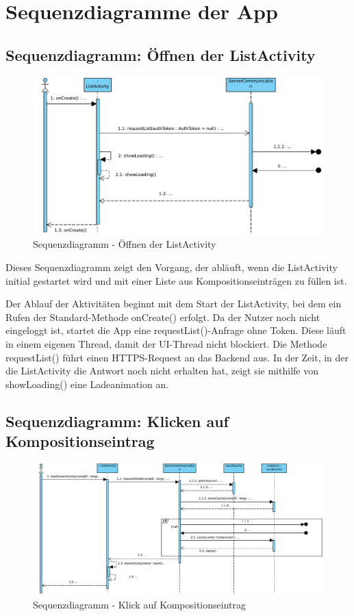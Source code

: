 \section*{Sequenzdiagramme der App}
\subsection*{Sequenzdiagramm: Öffnen der ListActivity}

\begin{figure}[h]
	\centering
	\includegraphics[width=\textwidth]{img/Diagramme/Sequenz/App_list}
	\caption{Sequenzdiagramm - Öffnen der ListActivity}
	\label{fig:sequenz-app_list}
\end{figure}
\noindent
Dieses Sequenzdiagramm zeigt den Vorgang, der abläuft, wenn die ListActivity initial gestartet wird und mit einer Liste aus Kompositionseinträgen zu füllen ist.\newline

\noindent Der Ablauf der Aktivitäten beginnt mit dem Start der ListActivity, bei dem ein Rufen der Standard-Methode onCreate() erfolgt. Da der Nutzer noch nicht eingeloggt ist, startet die App eine requestList()-Anfrage ohne Token. Diese läuft in einem eigenen Thread, damit der UI-Thread nicht blockiert. Die Methode requestList() führt einen HTTPS-Request an das Backend aus. In der Zeit, in der die ListActivity die Antwort noch nicht erhalten hat, zeigt sie mithilfe von showLoading() eine Ladeanimation an.
\pagebreak
\subsection*{Sequenzdiagramm: Klicken auf Kompositionseintrag}

\begin{figure}[h]
	\centering
	\includegraphics[width=\textwidth]{img/Diagramme/Sequenz/App_detail}
	\caption{Sequenzdiagramm - Klick auf Kompositionseintrag}
	\label{fig:sequenz-App_detail}
\end{figure}


